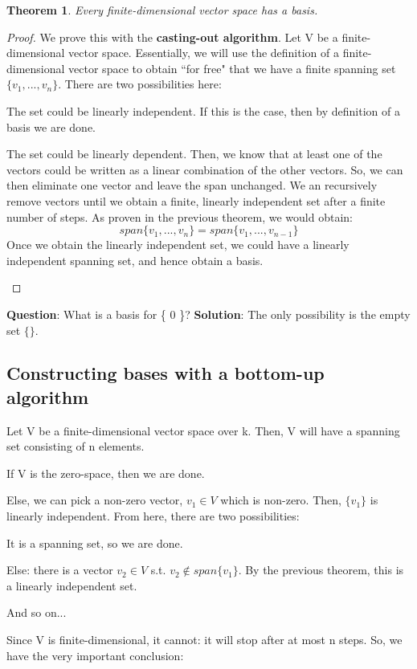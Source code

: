 \documentclass[a4paper, 12pt]{article}
\newtheorem{theorem}{Theorem}
\theoremstyle{definition}
\theoremstyle{definition}
\theoremstyle{definition}
\theoremstyle{definition}
\newenvironment{enumerate_tight}{
	\begin{enumerate}
		\setlength{\itemsep}{0pt}
		\setlength{\parskip}{0pt}
	}{\end{enumerate}}
\begin{document}
{\begin{theorem}
	Every finite-dimensional vector space has a basis. 
\end{theorem}

\begin{proof}
	We prove this with the \textbf{casting-out algorithm}. Let V be a finite-dimensional vector space. Essentially, we will use the definition of a finite-dimensional vector space to obtain ``for free" that we have a finite spanning set $\{ v_1, ..., v_n \}$. There are two possibilities here: 
	\begin{enumerate_tight}
		\item The set could be linearly independent. If this is the case, then by definition of a basis we are done. 
		\item The set could be linearly dependent. Then, we know that at least one of the vectors could be written as a linear combination of the other vectors. So, we can then eliminate one vector and leave the span unchanged. We an recursively remove vectors until we obtain a finite, linearly independent set after a finite number of steps. As proven in the previous theorem, we would obtain: 
		$$ span\{ v_1,..., v_n \} = span \{ v_1, ..., v_{n-1} \} $$
		Once we obtain the linearly independent set, we could have a linearly independent spanning set, and hence obtain a basis. 
	\end{enumerate_tight}
\end{proof} 

\textbf{Question}: What is a basis for \{ 0 \}? \newline
\textbf{Solution}: The only possibility is the empty set $\{ \}$. 


\subsection{Constructing bases with a bottom-up algorithm}
Let V be a finite-dimensional vector space over k. Then, V will have a spanning set consisting of n elements. 
\begin{enumerate_tight}
	\item If V is the zero-space, then we are done.
	\item Else, we can pick a non-zero vector, $v_1 \in V$ which is non-zero. Then, $\{ v_1 \}$ is linearly independent. From here, there are two possibilities: 
	\begin{enumerate_tight}
		\item It is a spanning set, so we are done. 
		\item Else: there is a vector $v_2 \in V$ s.t. $v_2 \notin span\{ v_1 \}$. By the previous theorem, this is a linearly independent set. 
		\item And so on...
	\end{enumerate_tight}
\end{enumerate_tight}
Since V is finite-dimensional, it cannot: it will stop after at most n steps. So, we have the very important conclusion: 
\begin{center} 



\end{center}}
\end{document}
